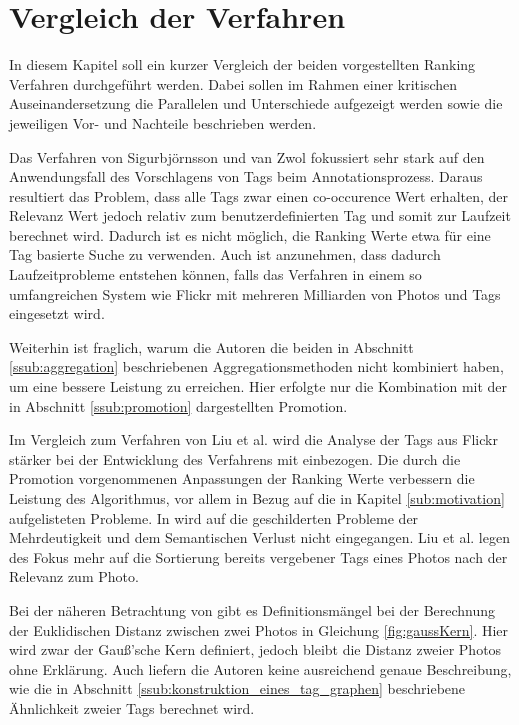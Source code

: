 \section{Vergleich der Verfahren} %
\label{sec:vergleich_und_bewertung_der_verfahren}

In diesem Kapitel soll ein kurzer Vergleich der beiden vorgestellten Ranking Verfahren durchgeführt werden. Dabei sollen im Rahmen einer kritischen Auseinandersetzung die Parallelen und Unterschiede aufgezeigt werden sowie die jeweiligen Vor- und Nachteile beschrieben werden.

Das Verfahren von Sigurbjörnsson und van Zwol fokussiert sehr stark auf den Anwendungsfall des Vorschlagens von Tags beim Annotationsprozess. Daraus resultiert das Problem, dass alle Tags zwar einen co-occurence Wert erhalten, der Relevanz Wert jedoch relativ zum benutzerdefinierten Tag und somit zur Laufzeit berechnet wird. Dadurch ist es nicht möglich, die Ranking Werte etwa für eine Tag basierte Suche zu verwenden. Auch ist anzunehmen, dass dadurch Laufzeitprobleme entstehen können, falls das Verfahren in einem so umfangreichen System wie Flickr mit mehreren Milliarden von Photos und Tags eingesetzt wird.

Weiterhin ist fraglich, warum die Autoren die beiden in Abschnitt \ref{ssub:aggregation} beschriebenen Aggregationsmethoden nicht kombiniert haben, um eine bessere Leistung zu erreichen. Hier erfolgte nur die Kombination mit der in Abschnitt \ref{ssub:promotion} dargestellten Promotion.

Im Vergleich zum Verfahren von Liu et al. wird die Analyse der Tags aus Flickr stärker bei der Entwicklung des Verfahrens mit einbezogen. Die durch die Promotion vorgenommenen Anpassungen der Ranking Werte verbessern die Leistung des Algorithmus, vor allem in Bezug auf die in Kapitel \ref{sub:motivation} aufgelisteten Probleme. In \cite{ranking} wird auf die geschilderten Probleme der Mehrdeutigkeit und dem Semantischen Verlust nicht eingegangen. Liu et al. legen des Fokus mehr auf die Sortierung bereits vergebener Tags eines Photos nach der Relevanz zum Photo.

Bei der näheren Betrachtung von \cite{ranking} gibt es Definitionsmängel bei der Berechnung der Euklidischen Distanz zwischen zwei Photos in Gleichung \ref{fig:gaussKern}. Hier wird zwar der Gauß'sche Kern definiert, jedoch bleibt die Distanz zweier Photos ohne Erklärung. Auch liefern die Autoren keine ausreichend genaue Beschreibung, wie die in Abschnitt \ref{ssub:konstruktion_eines_tag_graphen} beschriebene Ähnlichkeit zweier Tags berechnet wird. 

